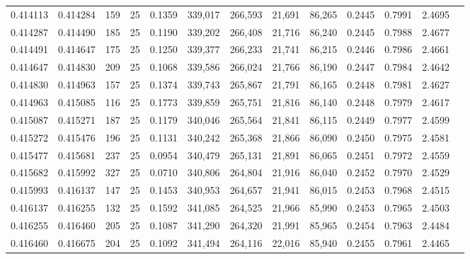 \begin{tabular}{rrrrrrrrrrrrr}
0.414113 & 0.414284 &   159 &  25 &                                     0.1359 & 339,017 & 266,593 &  21,691 &  86,265 & 0.2445 & 0.7991 & 2.4695 \\
0.414287 & 0.414490 &   185 &  25 &                                     0.1190 & 339,202 & 266,408 &  21,716 &  86,240 & 0.2445 & 0.7988 & 2.4677 \\
0.414491 & 0.414647 &   175 &  25 &                                     0.1250 & 339,377 & 266,233 &  21,741 &  86,215 & 0.2446 & 0.7986 & 2.4661 \\
0.414647 & 0.414830 &   209 &  25 &                                     0.1068 & 339,586 & 266,024 &  21,766 &  86,190 & 0.2447 & 0.7984 & 2.4642 \\
0.414830 & 0.414963 &   157 &  25 &                                     0.1374 & 339,743 & 265,867 &  21,791 &  86,165 & 0.2448 & 0.7981 & 2.4627 \\
0.414963 & 0.415085 &   116 &  25 &                                     0.1773 & 339,859 & 265,751 &  21,816 &  86,140 & 0.2448 & 0.7979 & 2.4617 \\
0.415087 & 0.415271 &   187 &  25 &                                     0.1179 & 340,046 & 265,564 &  21,841 &  86,115 & 0.2449 & 0.7977 & 2.4599 \\
0.415272 & 0.415476 &   196 &  25 &                                     0.1131 & 340,242 & 265,368 &  21,866 &  86,090 & 0.2450 & 0.7975 & 2.4581 \\
0.415477 & 0.415681 &   237 &  25 &                                     0.0954 & 340,479 & 265,131 &  21,891 &  86,065 & 0.2451 & 0.7972 & 2.4559 \\
0.415682 & 0.415992 &   327 &  25 &                                     0.0710 & 340,806 & 264,804 &  21,916 &  86,040 & 0.2452 & 0.7970 & 2.4529 \\
0.415993 & 0.416137 &   147 &  25 &                                     0.1453 & 340,953 & 264,657 &  21,941 &  86,015 & 0.2453 & 0.7968 & 2.4515 \\
0.416137 & 0.416255 &   132 &  25 &                                     0.1592 & 341,085 & 264,525 &  21,966 &  85,990 & 0.2453 & 0.7965 & 2.4503 \\
0.416255 & 0.416460 &   205 &  25 &                                     0.1087 & 341,290 & 264,320 &  21,991 &  85,965 & 0.2454 & 0.7963 & 2.4484 \\
0.416460 & 0.416675 &   204 &  25 &                                     0.1092 & 341,494 & 264,116 &  22,016 &  85,940 & 0.2455 & 0.7961 & 2.4465 \\

\end{tabular}
